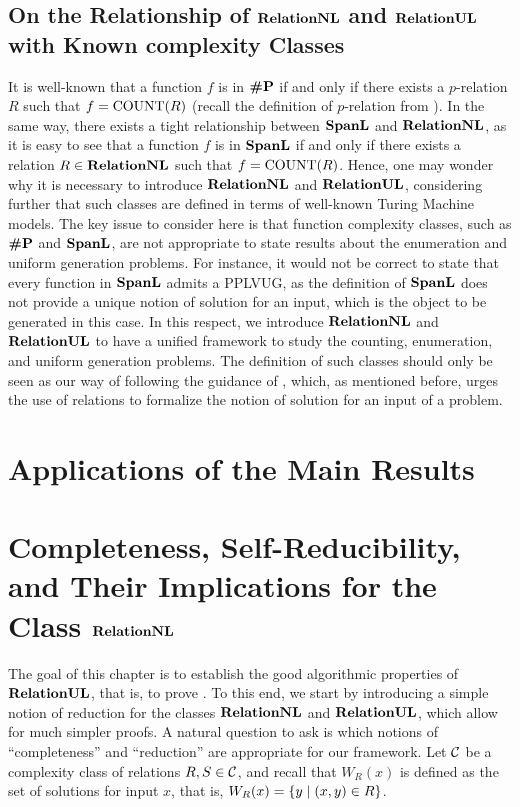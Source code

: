 \documentclass[11pt,twoside=off,numbers=noenddot]{scrbook}
\begin{document}
\section{On the Relationship of $\textbf{RelationNL}$ and $\textbf{RelationUL}$ with Known complexity Classes}
It is well-known that a function $f$ is in $\textbf{\#P}$ if and only if there exists a $p$-relation $R$ such that $f = \text{COUNT}(R)$ (recall the definition of $p$-relation from ). In the same way, there exists a tight relationship between $\textbf{SpanL}$ and $\textbf{RelationNL}$, as it is easy to see that a function $f$ is in $\textbf{SpanL}$ if and only if there exists a relation $R \in \textbf{RelationNL}$ such that $f = \text{COUNT}(R)$. Hence, one may wonder why it is necessary to introduce $\textbf{RelationNL}$ and $\textbf{RelationUL}$, considering further that such classes are defined in terms of well-known Turing Machine models. The key issue to consider here is that function complexity classes, such as $\textbf{\#P}$ and $\textbf{SpanL}$, are not appropriate to state results about the enumeration and uniform generation problems. For instance, it would not be correct to state that every function in $\textbf{SpanL}$ admits a PPLVUG, as the definition of $\textbf{SpanL}$ does not provide a unique notion of solution for an input, which is the object to be generated in this case. In this respect, we introduce $\textbf{RelationNL}$ and $\textbf{RelationUL}$ to have a unified framework to study the counting, enumeration, and uniform generation problems. The definition of such classes should only be seen as our way of following the guidance of \cite{jerrum1986random}, which, as mentioned before, urges the use of relations to formalize the notion of solution for an input of a problem.

\chapter{Applications of the Main Results}


\chapter{Completeness, Self-Reducibility, and Their Implications for the Class $\textbf{RelationNL}$}
The goal of this chapter is to establish the good algorithmic properties of $\textbf{RelationUL}$, that is, to prove . To this end, we start by introducing a simple notion of reduction for the classes $\textbf{RelationNL}$ and $\textbf{RelationUL}$, which allow for much simpler proofs. A natural question to ask is which notions of ``completeness'' and ``reduction'' are appropriate for our framework. Let $\mathcal{C}$ be a complexity class of relations $R, S \in \mathcal{C}$, and recall that $W_R(x)$ is defined as the set of solutions for input $x$, that is, $W_R(x) = \{ y \mid (x, y) \in R \}$.
\end{document}
